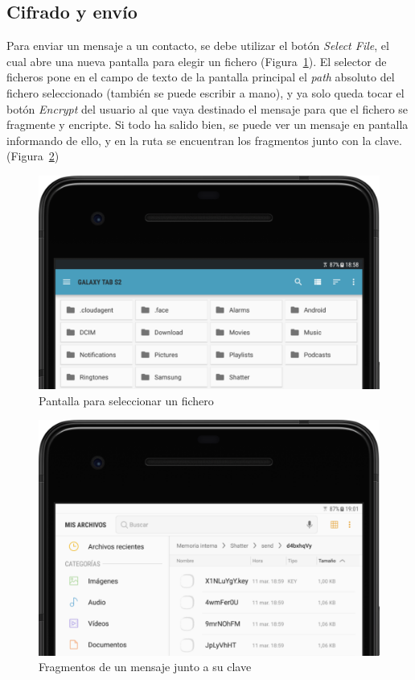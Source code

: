 \subsection{Cifrado y envío}

Para enviar un mensaje a un contacto, se debe utilizar el botón \emph{Select File}, el cual abre una nueva pantalla para elegir un fichero (Figura~\ref{fig:file_picker}). El selector de ficheros pone en el campo de texto de la pantalla principal el \emph{path} absoluto del fichero seleccionado (también se puede escribir a mano), y ya solo queda tocar el botón \emph{Encrypt} del usuario al que vaya destinado el mensaje para que el fichero se fragmente y encripte. Si todo ha salido bien, se puede ver un mensaje en pantalla informando de ello, y en la ruta  se encuentran los fragmentos junto con la clave. (Figura~\ref{fig:encfiles})

\begin{figure}[!htb]
  \centering
  \includegraphics[scale=0.4]{Figures/file_picker}
  \decoRule
  \caption[Shatter (\emph{File Picker})]{Pantalla para seleccionar un fichero}
  \label{fig:file_picker}
\end{figure}

\begin{figure}[!htb]
  \centering
  \includegraphics[scale=0.4]{Figures/encfiles}
  \decoRule
  \caption[Shatter (Mensaje fragmentado)]{Fragmentos de un mensaje junto a su clave}
  \label{fig:encfiles}
\end{figure}

